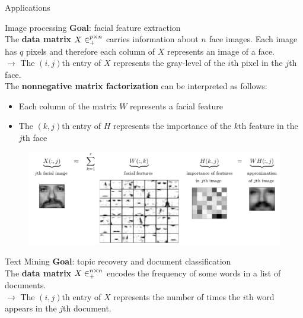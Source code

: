 \documentclass[final]{beamer}
\newlength{\twocolwid}
\newlength{\threecolwid}
\begin{document}
\begin{frame}
\begin{columns}[t]
\begin{column}{\threecolwid}
\begin{columns}[t]
\begin{column}{\twocolwid} %


\begin{exampleblock}{Applications}
\begin{block}{Image processing}
\textbf{Goal}: facial feature extraction\\
The \textbf{data matrix} $X\in\real^{p\times n}_+$ carries information about $n$ face images. Each image has $q$ pixels and therefore each column of $X$ represents an image of a face.\\
$\rightarrow$ The $(i,j)$th entry of $X$ represents the gray-level of the $i$th pixel in the $j$th face.\\
The \textbf{nonnegative matrix factorization} can be interpreted as follows:\\
\begin{itemize}
    \item Each column of the matrix $W$ represents a facial feature
    \item The $(k,j)$th entry of $H$ represents the importance of the $k$th feature in the $j$th face
\end{itemize}
\begin{figure}
    \centering
    \includegraphics{presentation/Poster/NMF_app1.png}
\end{figure}
\end{block}
\begin{block}{Text Mining}
\textbf{Goal}: topic recovery and document classification\\
The \textbf{data matrix} $X\in\real^{n\times n}_+$ encodes the frequency of some words in a list of documents.\\
$\rightarrow$ The $(i,j)$th entry of $X$ represents the number of times the $i$th word appears in the $j$th document.\\

\end{block}
\end{exampleblock}
\end{column}
\end{columns}
\end{column}
\end{columns}
\end{frame}
\end{document}
